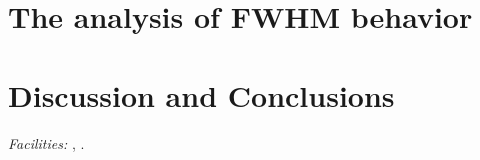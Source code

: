 \documentclass[12pt,preprint]{aastex}
\begin{document}
 

\section{The analysis of FWHM behavior} 

 

\section{Discussion and Conclusions} 

 


\acknowledgments






{\it Facilities:} , .


\end{document}

